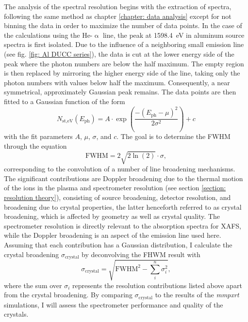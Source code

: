 The analysis of the spectral resolution begins with the extraction of spectra, following the same method as chapter \ref{chapter: data analysis} except for not binning the data in order to maximize the number of data points. In the case of the calculations using the He-$\upalpha$ line, the peak at \SI{1598.4}{\electronvolt} in aluminum source spectra is first isolated. Due to the influence of a neighboring small emission line (see fig. \ref{fig: Al DUCC series}), the data is cut at the lower energy side of the peak where the photon numbers are below the half maximum. The empty region is then replaced by mirroring the higher energy side of the line, taking only the photon numbers with values below half the maximum. Consequently, a near symmetrical, approximately Gaussian peak remains. The data points are then fitted to a Gaussian function of the form
\begin{equation}
	N_{\text{st,eV}}(E_{\text{ph}}) = A\cdot \exp\left(\frac{-(E_{\text{ph}}-\mu)^2}{2\sigma^2}\right)+c
\end{equation}
with the fit parameters $A$, $\mu$, $\sigma$, and $c$. The goal is to determine the FWHM through the equation
\begin{equation}
	\text{FWHM} = 2\sqrt{2\ln(2)}\cdot \sigma,
\end{equation}
corresponding to the convolution of a number of line broadening mechanisms. The significant contributions are Doppler broadening due to the thermal motion of the ions in the plasma and spectrometer resolution (see section \ref{section: resolution theory}), consisting of source broadening, detector resolution, and broadening due to crystal properties, the latter henceforth referred to as crystal broadening, which is affected by geometry as well as crystal quality. The spectrometer resolution is directly relevant to the absorption spectra for XAFS, while the Doppler broadening is an aspect of the emission line used here. Assuming that each contribution has a Gaussian distribution, I calculate the crystal broadening $\sigma_{\text{crystal}}$ by deconvolving the FHWM result with 
\begin{equation}
	\sigma_{\text{crystal}} = \sqrt{\text{FWHM}^2-\sum_{i}^{n}\sigma_i^2},
	\label{eq: crystal broadening}
\end{equation}
where the sum over $\sigma_i$ represents the resolution contributions listed above apart from the crystal broadening. By comparing $\sigma_{\text{crystal}}$ to the results of the \textit{mmpxrt} simulations, I will assess the spectrometer performance and quality of the crystals.

